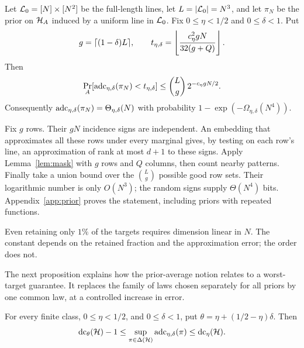 \begin{theorem}\label{thm:prior}
Let $\mathcal L_0=[N]\times[N^2]$ be the full-length lines, let $L=|\mathcal L_0|=N^3$, and let $\pi_N$ be the prior on $\mathcal H_A$ induced by a uniform line in $\mathcal L_0$. Fix $0\le\eta<1/2$ and $0\le\delta<1$. Put
\begin{equation}
 g=\lceil (1-\delta)L\rceil,\qquad
 t_{\eta,\delta}=\left\lfloor\frac{c_\eta^2 gN}{32(g+Q)}\right\rfloor.
 \label{eq:prior-threshold}
\end{equation}
Then
\begin{equation}
 \Pr_A[\operatorname{adc}_{\eta,\delta}(\pi_N)<t_{\eta,\delta}]
 \le \binom{L}{g}\,2^{-c_\eta gN/2}.
 \label{eq:prior-prob}
\end{equation}
Consequently $\operatorname{adc}_{\eta,\delta}(\pi_N)=\Theta_{\eta,\delta}(N)$ with probability $1-\exp(-\Omega_{\eta,\delta}(N^4))$.
\end{theorem}

\begin{proofsketch}
Fix $g$ rows. Their $gN$ incidence signs are independent. An embedding that approximates all these rows under every marginal gives, by testing on each row's line, an approximation of rank at most $d+1$ to these signs. Apply Lemma~\ref{lem:mask} with $g$ rows and $Q$ columns, then count nearby patterns. Finally take a union bound over the $\binom{L}{g}$ possible good row sets. Their logarithmic number is only $O(N^3)$; the random signs supply $\Theta(N^4)$ bits. Appendix~\ref{app:prior} proves the statement, including priors with repeated functions.
\end{proofsketch}

Even retaining only $1\%$ of the targets requires dimension linear in $N$. The constant depends on the retained fraction and the approximation error; the order does not.

The next proposition explains how the prior-average notion relates to a worst-target guarantee. It replaces the family of laws chosen separately for all priors by one common law, at a controlled increase in error.

\begin{proposition}\label{prop:prior-minimax}
For every finite class, $0\le\eta<1/2$, and $0\le\delta<1$, put $\theta=\eta+(1/2-\eta)\delta$. Then
\begin{equation}
 \operatorname{dc}_\theta(\mathcal H)-1
 \le \sup_{\pi\in\Delta(\mathcal H)}\operatorname{adc}_{\eta,\delta}(\pi)
 \le \operatorname{dc}_\eta(\mathcal H).
 \label{eq:prior-minimax}
\end{equation}
\end{proposition}

